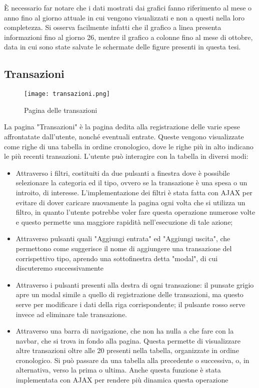 \documentclass[binding=0.6cm, oneside, noexaminfo, italian]{sapthesis}
\begin{document}
\MakeUppercase{è} necessario far notare che i dati mostrati dai grafici fanno riferimento al mese o anno fino al giorno attuale in cui vengono visualizzati e non a questi nella loro completezza. Si osserva facilmente infatti che il grafico a linea presenta informazioni fino al giorno 26, mentre il grafico a colonne fino al mese di ottobre, data in cui sono state salvate le schermate delle figure presenti in questa tesi.
\newpage
\subsection{Transazioni}
\begin{figure}[h]
    \centering
    \texttt{[image: transazioni.png]}
    \caption{Pagina delle transazioni}
    \label{fig:transazioni}
\end{figure}
La pagina "Transazioni" è la pagina dedita alla registrazione delle varie spese affrontatate dall'utente, nonché eventuali entrate. Queste vengono visualizzate come righe di una tabella in ordine cronologico, dove le righe più in alto indicano le più recenti transazioni. L'utente può interagire con la tabella in diversi modi:
\begin{itemize}
    \item Attraverso i filtri, costituiti da due pulsanti a finestra dove è possibile selezionare la categoria ed il tipo, ovvero se la transazione è una spesa o un introito, di interesse. L'implementazione dei filtri è stata fatta con AJAX per evitare di dover caricare nuovamente la pagina ogni volta che si utilizza un filtro, in quanto l'utente potrebbe voler fare questa operazione numerose volte e questo permette una maggiore rapidità nell'esecuzione di tale azione;
    \item Attraverso pulsanti quali "Aggiungi entrata" ed "Aggiungi uscita", che permettono come suggerisce il nome di aggiungere una transazione del corrispettivo tipo, aprendo una sottofinestra detta "modal", di cui discuteremo successivamente
    \item Attraverso i pulsanti presenti alla destra di ogni transazione: il punsate grigio apre un modal simile a quello di registrazione delle transazioni, ma questo serve per modificare i dati della riga corrispondente; il pulsante rosso serve invece ad eliminare tale transazione.
    \item Attraverso una barra di navigazione, che non ha nulla a che fare con la navbar, che si trova in fondo alla pagina. Questa permette di visualizzare altre transazioni oltre alle 20 presenti nella tabella, organizzate in ordine cronologico. Si può passare da una tabella alla precedente o successiva, o, in alternativa, verso la prima o ultima. Anche questa funzione è stata implementata con AJAX per rendere più dinamica questa operazione
\end{itemize}
\end{document}

